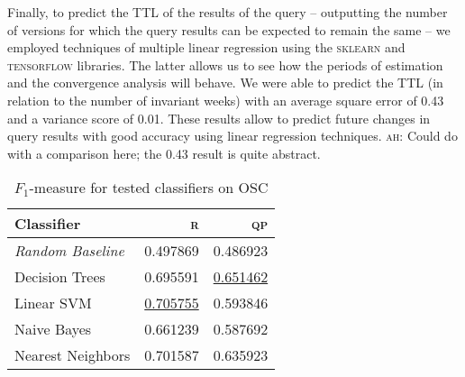 \documentclass[runningheads]{llncs}
\newcommand{\ah}[1]{{\color{blue}\textsc{ah:} #1}}
\begin{document}
Finally, to predict the TTL of the results of the query -- outputting the number of versions for which the query results can be expected to remain the same -- we employed techniques of multiple linear regression using the \textsc{sklearn} and \textsc{tensorflow} libraries. The latter allows us to see how the periods of estimation and the convergence analysis will behave. We were able to predict the TTL (in relation to the number of invariant weeks) with an average square error of 0.43 and a variance score of 0.01. These results allow to predict future changes in query results with good accuracy using linear regression techniques. \ah{Could do with a comparison here; the 0.43 result is quite abstract.}


\begin{table*}[t]
	\centering
	\caption{$F_1$-measure for tested classifiers on OSC}
	\label{tab:classifier}
	\begin{tabular}{lrr}    \toprule	
		\textbf{Classifier}                   & \textsc{r} & \textsc{qp} \\    \midrule
		\textit{Random Baseline}				 & 0.497869 & 0.486923 \\\midrule
		Decision Trees                & 0.695591 & \underline{0.651462} \\
		Linear SVM                   & \underline{0.705755} & 0.593846 \\
		Naive Bayes                  & 0.661239 & 0.587692 \\ 
		Nearest Neighbors            & 0.701587 & 0.635923 \\   \bottomrule
	\end{tabular}
\end{table*}
\begin{comment}

\begin{figure}
	\centering
	\begin{tikzpicture}[thick, scale=1]
	\begin{axis}
	
	\addplot 
	coordinates {("Base Dummy",40137188)("Nearest Neighbors",4563382)("Decision Tree",29302968)("Linear SVM",8906402)("Naive Bayes",11455047)};
	\addplot 
	coordinates {(Base Dummy,40137188)(Nearest Neighbors,4563382)(Decision Tree,29302968)(Linear SVM,8906402)(Naive Bayes,11455047)};
	\legend{Added, Removed}
	\end{axis}
	\end{tikzpicture}
	\caption{Triples added and removed in Wikidata.}
	\label{graph:delta}
\end{figure}
\end{comment}
\end{document}

